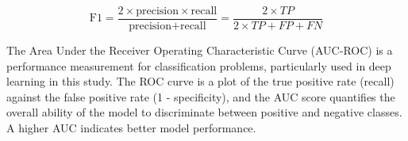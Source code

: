 \begin{equation}
	\text{F1} = \frac{2 \times \text{precision} \times \text{recall}}{\text{precision} + \text{recall}} = \frac{2 \times TP}{2 \times TP + FP + FN}
	\label{eq:f1}
\end{equation}

The Area Under the Receiver Operating Characteristic Curve (AUC-ROC) is a performance measurement for classification problems, particularly used in deep learning in this study. The ROC curve is a plot of the true positive rate (recall) against the false positive rate (1 - specificity), and the AUC score quantifies the overall ability of the model to discriminate between positive and negative classes. A higher AUC indicates better model performance. \cite{nahm2022} 